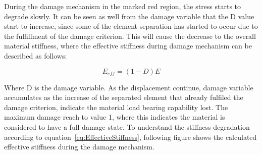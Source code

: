 \documentclass[12pt]{article}
\begin{document}
\hspace{1em} During the damage mechanism in the marked red region, the stress starts to degrade slowly. It can be seen as well from the
damage variable that the D value start to increase, since some of the element separation has started to occur due to the fulfillment of the damage criterion.
This will cause the decrease to the overall material stiffness, where the effective stiffness during damage mechanism can be described as follows:

\begin{equation}
  \label{eq:EffectiveStiffness}
  E_{eff} = (1-D)E
\end{equation}

\vspace{1em}

Where D is the damage variable. As the displacement continue, damage variable accumulates as the increase of the separated element that already fulfiled the damage criterion, indicate the material load bearing capability lost.
The maximum damage reach to value 1, where this indicates the material is considered to have a full damage state. To understand the stiffness degradation according to equation~\ref{eq:EffectiveStiffness},
following figure shows the calculated effective stiffness during the damage mechanism. 
\end{document}
